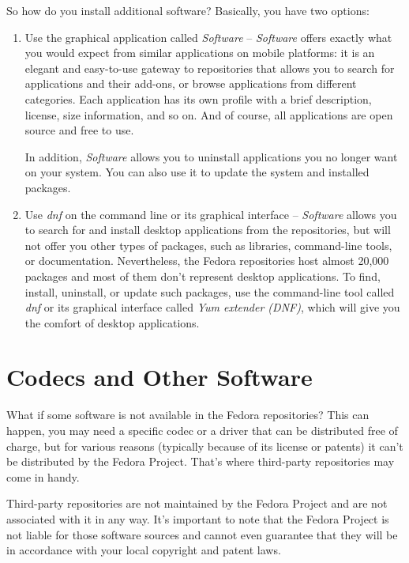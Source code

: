 So how do you install additional software? Basically, you have two options:
\begin{enumerate}
\item Use the graphical application called \emph{Software} -- \emph{Software} offers exactly what you would expect from similar applications on mobile platforms: it is an elegant and easy-to-use gateway to repositories that allows you to search for applications and their add-ons, or browse applications from different categories. Each application has its own profile with a brief description, license, size information, and so on. And of course, all applications are open source and free to use.

In addition, \emph{Software} allows you to uninstall applications you no longer want on your system. You can also use it to update the system and installed packages.


\item Use \emph{dnf} on the command line or its graphical interface -- \emph{Software} allows you to search for and install desktop applications from the repositories, but will not offer you other types of packages, such as libraries, command-line tools, or documentation. Nevertheless, the Fedora repositories host almost 20,000 packages and most of them don't represent desktop applications. To find, install, uninstall, or update such packages, use the command-line tool called \emph{dnf} or its graphical interface called \emph{Yum extender (DNF)}, which will give you the comfort of desktop applications.
\end{enumerate}

\section*{Codecs and Other Software}

What if some software is not available in the Fedora repositories? This can happen, you may need a specific codec or a driver that can be distributed free of charge, but for various reasons (typically because of its license or patents) it can't be distributed by the Fedora Project. That's where third-party repositories may come in handy.

Third-party repositories are not maintained by the Fedora Project and are not associated with it in any way. It's important to note that the Fedora Project is not liable for those software sources and cannot even guarantee that they will be in accordance with your local copyright and patent laws.

